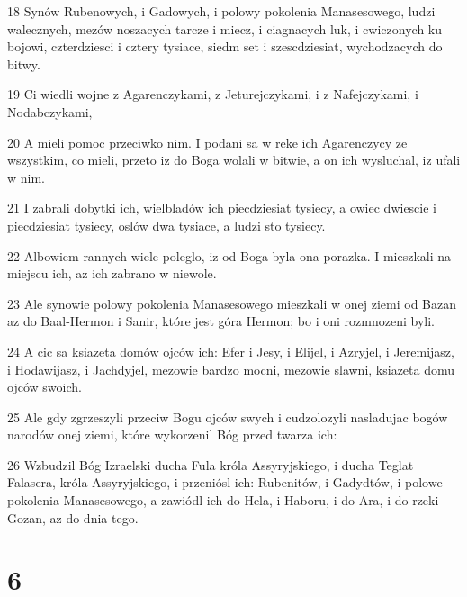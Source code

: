 \par 18 Synów Rubenowych, i Gadowych, i polowy pokolenia Manasesowego, ludzi walecznych, mezów noszacych tarcze i miecz, i ciagnacych luk, i cwiczonych ku bojowi, czterdziesci i cztery tysiace, siedm set i szescdziesiat, wychodzacych do bitwy.
\par 19 Ci wiedli wojne z Agarenczykami, z Jeturejczykami, i z Nafejczykami, i Nodabczykami,
\par 20 A mieli pomoc przeciwko nim. I podani sa w reke ich Agarenczycy ze wszystkim, co mieli, przeto iz do Boga wolali w bitwie, a on ich wysluchal, iz ufali w nim.
\par 21 I zabrali dobytki ich, wielbladów ich piecdziesiat tysiecy, a owiec dwiescie i piecdziesiat tysiecy, oslów dwa tysiace, a ludzi sto tysiecy.
\par 22 Albowiem rannych wiele poleglo, iz od Boga byla ona porazka. I mieszkali na miejscu ich, az ich zabrano w niewole.
\par 23 Ale synowie polowy pokolenia Manasesowego mieszkali w onej ziemi od Bazan az do Baal-Hermon i Sanir, które jest góra Hermon; bo i oni rozmnozeni byli.
\par 24 A cic sa ksiazeta domów ojców ich: Efer i Jesy, i Elijel, i Azryjel, i Jeremijasz, i Hodawijasz, i Jachdyjel, mezowie bardzo mocni, mezowie slawni, ksiazeta domu ojców swoich.
\par 25 Ale gdy zgrzeszyli przeciw Bogu ojców swych i cudzolozyli nasladujac bogów narodów onej ziemi, które wykorzenil Bóg przed twarza ich:
\par 26 Wzbudzil Bóg Izraelski ducha Fula króla Assyryjskiego, i ducha Teglat Falasera, króla Assyryjskiego, i przeniósl ich: Rubenitów, i Gadydtów, i polowe pokolenia Manasesowego, a zawiódl ich do Hela, i Haboru, i do Ara, i do rzeki Gozan, az do dnia tego.

\chapter{6}

